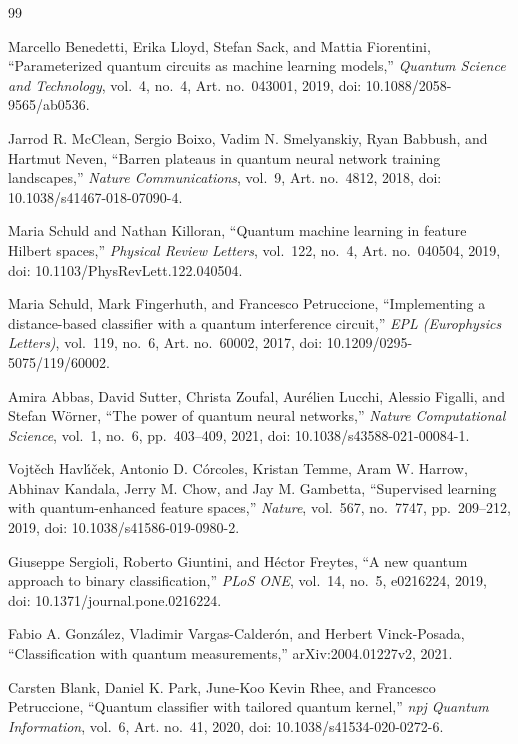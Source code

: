 \documentclass[conference]{IEEEtran}
\begin{document}

\begin{thebibliography}{99}

Marcello Benedetti, Erika Lloyd, Stefan Sack, and Mattia Fiorentini, ``Parameterized quantum circuits as machine learning models,'' \emph{Quantum Science and Technology}, vol.~4, no.~4, Art. no.~043001, 2019, doi: 10.1088/2058-9565/ab0536.

Jarrod R. McClean, Sergio Boixo, Vadim N. Smelyanskiy, Ryan Babbush, and Hartmut Neven, ``Barren plateaus in quantum neural network training landscapes,'' \emph{Nature Communications}, vol.~9, Art. no.~4812, 2018, doi: 10.1038/s41467-018-07090-4.

Maria Schuld and Nathan Killoran, ``Quantum machine learning in feature Hilbert spaces,'' \emph{Physical Review Letters}, vol.~122, no.~4, Art. no.~040504, 2019, doi: 10.1103/PhysRevLett.122.040504.

Maria Schuld, Mark Fingerhuth, and Francesco Petruccione, ``Implementing a distance-based classifier with a quantum interference circuit,'' \emph{EPL (Europhysics Letters)}, vol.~119, no.~6, Art. no.~60002, 2017, doi: 10.1209/0295-5075/119/60002.

Amira Abbas, David Sutter, Christa Zoufal, Aur\'elien Lucchi, Alessio Figalli, and Stefan W\"{o}rner, ``The power of quantum neural networks,'' \emph{Nature Computational Science}, vol.~1, no.~6, pp.~403--409, 2021, doi: 10.1038/s43588-021-00084-1.

Vojt\v{e}ch Havl\'{\i}\v{c}ek, Antonio D. C\'orcoles, Kristan Temme, Aram W. Harrow, Abhinav Kandala, Jerry M. Chow, and Jay M. Gambetta, ``Supervised learning with quantum-enhanced feature spaces,'' \emph{Nature}, vol.~567, no.~7747, pp.~209--212, 2019, doi: 10.1038/s41586-019-0980-2.

Giuseppe Sergioli, Roberto Giuntini, and H\'ector Freytes, ``A new quantum approach to binary classification,'' \emph{PLoS ONE}, vol.~14, no.~5, e0216224, 2019, doi: 10.1371/journal.pone.0216224.

Fabio A. Gonz\'alez, Vladimir Vargas-Calder\'on, and Herbert Vinck-Posada, ``Classification with quantum measurements,'' arXiv:2004.01227v2, 2021.

Carsten Blank, Daniel K. Park, June-Koo Kevin Rhee, and Francesco Petruccione, ``Quantum classifier with tailored quantum kernel,'' \emph{npj Quantum Information}, vol.~6, Art. no.~41, 2020, doi: 10.1038/s41534-020-0272-6.


\end{thebibliography}
\end{document}
